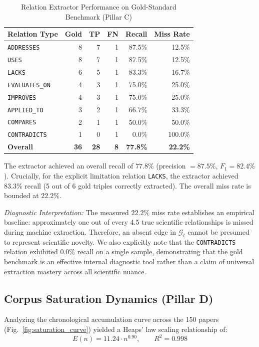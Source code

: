 \documentclass[conference,10pt]{IEEEtran}
\begin{document}
\begin{table}[t]
\caption{Relation Extractor Performance on Gold-Standard Benchmark (Pillar C)}
\label{tab:extractor_recall}
\centering
\footnotesize
\begin{tabular}{lrrrrr}
\toprule
\textbf{Relation Type} & \textbf{Gold} & \textbf{TP} & \textbf{FN} & \textbf{Recall} & \textbf{Miss Rate} \\
\midrule
\texttt{ADDRESSES}     & 8  & 7  & 1 & 87.5\% & 12.5\% \\
\texttt{USES}          & 8  & 7  & 1 & 87.5\% & 12.5\% \\
\texttt{LACKS}         & 6  & 5  & 1 & 83.3\% & 16.7\% \\
\texttt{EVALUATES\_ON} & 4  & 3  & 1 & 75.0\% & 25.0\% \\
\texttt{IMPROVES}      & 4  & 3  & 1 & 75.0\% & 25.0\% \\
\texttt{APPLIED\_TO}   & 3  & 2  & 1 & 66.7\% & 33.3\% \\
\texttt{COMPARES}      & 2  & 1  & 1 & 50.0\% & 50.0\% \\
\texttt{CONTRADICTS}   & 1  & 0  & 1 & 0.0\%  & 100.0\% \\
\midrule
\textbf{Overall}       & \textbf{36} & \textbf{28} & \textbf{8} & \textbf{77.8\%} & \textbf{22.2\%} \\
\bottomrule
\end{tabular}
\end{table}

The extractor achieved an overall recall of $77.8\%$ (precision $= 87.5\%$, $F_1 = 82.4\%$). Crucially, for the explicit limitation relation \texttt{LACKS}, the extractor achieved $83.3\%$ recall (5 out of 6 gold triples correctly extracted). The overall miss rate is bounded at $22.2\%$.

\emph{Diagnostic Interpretation:} The measured $22.2\%$ miss rate establishes an empirical baseline: approximately one out of every 4.5 true scientific relationships is missed during machine extraction. Therefore, an absent edge in $\mathcal{G}_t$ cannot be presumed to represent scientific novelty. We also explicitly note that the \texttt{CONTRADICTS} relation exhibited $0.0\%$ recall on a single sample, demonstrating that the gold benchmark is an effective internal diagnostic tool rather than a claim of universal extraction mastery across all scientific nuance.

\subsection{Corpus Saturation Dynamics (Pillar D)}
Analyzing the chronological accumulation curve across the 150 papers (Fig.~\ref{fig:saturation_curve}) yielded a Heaps' law scaling relationship of:
\begin{equation}
E(n) = 11.24 \cdot n^{0.90}, \qquad R^2 = 0.998
\end{equation}
\end{document}
